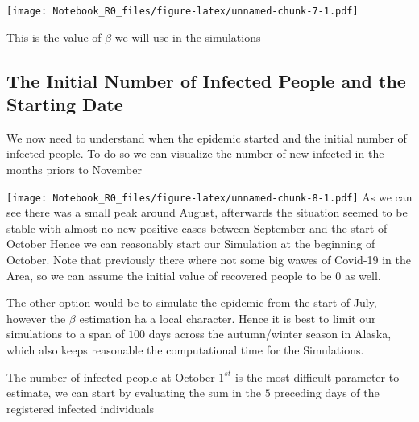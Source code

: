 \documentclass[
]{article}
\newenvironment{Shaded}{\begin{snugshade}}{\end{snugshade}}
\newcommand{\FunctionTok}[1]{\textcolor[rgb]{0.13,0.29,0.53}{\textbf{#1}}}
\newcommand{\NormalTok}[1]{#1}
\newcommand{\OtherTok}[1]{\textcolor[rgb]{0.56,0.35,0.01}{#1}}
\newcommand{\SpecialCharTok}[1]{\textcolor[rgb]{0.81,0.36,0.00}{\textbf{#1}}}
\newcommand{\StringTok}[1]{\textcolor[rgb]{0.31,0.60,0.02}{#1}}
\begin{document}
\texttt{[image: Notebook\_R0\_files/figure-latex/unnamed-chunk-7-1.pdf]}

This is the value of \(\beta\) we will use in the simulations

\subsection{The Initial Number of Infected People and the Starting
Date}\label{the-initial-number-of-infected-people-and-the-starting-date}

We now need to understand when the epidemic started and the initial
number of infected people. To do so we can visualize the number of new
infected in the months priors to November

\begin{Shaded}
\end{Shaded}

\texttt{[image: Notebook\_R0\_files/figure-latex/unnamed-chunk-8-1.pdf]}
As we can see there was a small peak around August, afterwards the
situation seemed to be stable with almost no new positive cases between
September and the start of October Hence we can reasonably start our
Simulation at the beginning of October. Note that previously there where
not some big wawes of Covid-19 in the Area, so we can assume the initial
value of recovered people to be \(0\) as well.

The other option would be to simulate the epidemic from the start of
July, however the \(\beta\) estimation ha a local character. Hence it is
best to limit our simulations to a span of \(100\) days across the
autumn/winter season in Alaska, which also keeps reasonable the
computational time for the Simulations.

The number of infected people at October \(1^{st}\) is the most
difficult parameter to estimate, we can start by evaluating the sum in
the \(5\) preceding days of the registered infected individuals
\end{document}
